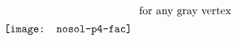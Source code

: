 \documentclass{standalone}
\begin{document}
$
\raisebox{-5.7mm}{\texttt{[image: nosol-p4-fac]}} \,\,\,\,\mbox{for any gray vertex}
$
\end{document}
